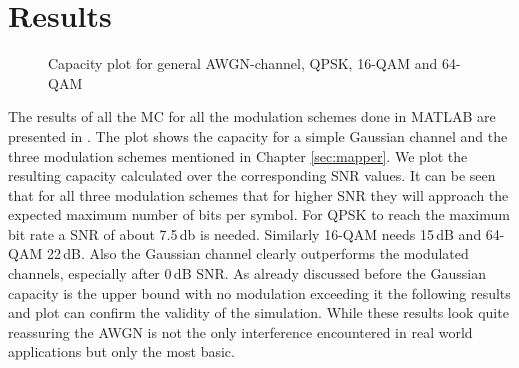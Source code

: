 \section{Results}
\begin{figure}[!htb]
		\setlength{}
	\setlength\fheight{0.4\textheight}
	\centering
	
	\caption{Capacity plot for general AWGN-channel, QPSK, 16-QAM and 64-QAM}
	\label{fig:capmod}
\end{figure}
The results of all the \gls{MC} for all the modulation schemes done in MATLAB are presented in . The plot shows the capacity for a simple Gaussian channel and the three modulation schemes mentioned in Chapter \eqref{sec:mapper}. We plot the resulting capacity calculated over the corresponding SNR values. 
It can be seen that for all three modulation schemes that for higher \gls{SNR} they will approach the expected maximum number of bits per symbol. For \gls{QPSK} to reach the maximum bit rate a \gls{SNR} of about 7.5\,db is needed. Similarly 16-QAM needs 15\,dB and 64-QAM 22\,dB. 
\newline
Also the Gaussian channel clearly outperforms the modulated channels, especially  after 0\,dB SNR. As already discussed before the Gaussian capacity is the upper bound with no modulation exceeding it the following results and plot can confirm the validity of the simulation. While these results look quite reassuring the \gls{AWGN} is not the only interference encountered in real world applications but only the most basic.


\clearpage